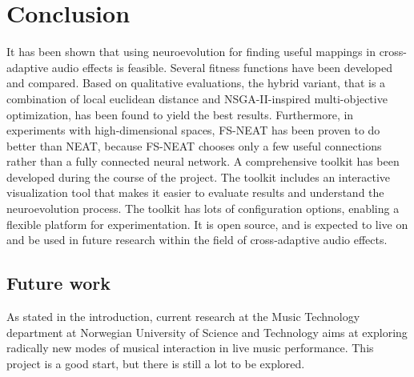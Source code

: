 \chapter{Conclusion}
It has been shown that using neuroevolution for finding useful mappings in cross-adaptive audio effects is feasible. Several fitness functions have been developed and compared. Based on qualitative evaluations, the hybrid variant, that is a combination of local euclidean distance and NSGA-II-inspired multi-objective optimization, has been found to yield the best results. Furthermore, in experiments with high-dimensional spaces, FS-NEAT has been proven to do better than NEAT, because FS-NEAT chooses only a few useful connections rather than a fully connected neural network. A comprehensive toolkit has been developed during the course of the project. The toolkit includes an interactive visualization tool that makes it easier to evaluate results and understand the neuroevolution process. The toolkit has lots of configuration options, enabling a flexible platform for experimentation. It is open source, and is expected to live on and be used in future research within the field of cross-adaptive audio effects.

\section{Future work}

As stated in the introduction, current research at the Music Technology department at Norwegian University of Science and Technology aims at exploring radically new modes of musical interaction in live music performance. This project is a good start, but there is still a lot to be explored.


